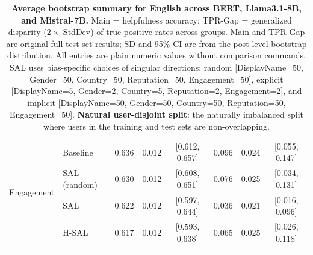 \begin{table}[th!]
{\begin{tabular}{ll c c c c c c}
\multirow{4}{*}{Engagement} & Baseline & 0.636 & 0.012 & [0.612, 0.657] & 0.096 & 0.024 & [0.055, 0.147] \\
\addlinespace[4pt]
& SAL (random) & 0.630 & 0.012 & [0.608, 0.651] & 0.076 & 0.025 & [0.034, 0.131] \\
\addlinespace[4pt]
& SAL & 0.622 & 0.012 & [0.597, 0.644] & 0.036 & 0.021 & [0.016, 0.096] \\
\addlinespace[4pt]
& H-SAL & 0.617 & 0.012 & [0.593, 0.638] & 0.065 & 0.025 & [0.026, 0.118] \\
\addlinespace[4pt]
\bottomrule
\end{tabular}
}
\caption{\textbf{Average bootstrap summary for English across BERT, Llama3.1-8B, and Mistral-7B.}
Main = helpfulness accuracy; TPR-Gap = generalized disparity ($2 \times$ StdDev) of true positive rates across groups.
Main and TPR-Gap are original full-test-set results; SD and 95\% CI are from the post-level bootstrap distribution.
All entries are plain numeric values without comparison commands.
SAL uses bias-specific choices of singular directions: random [DisplayName=50, Gender=50, Country=50, Reputation=50, Engagement=50], explicit [DisplayName=5, Gender=2, Country=5, Reputation=2, Engagement=2], and implicit [DisplayName=50, Gender=50, Country=50, Reputation=50, Engagement=50].
\textbf{Natural user-disjoint split}: the naturally imbalanced split where users in the training and test sets are non-overlapping.}
\label{tab:ste-bootstrap-summary-plain-english-natural-disjoint}
\end{table}
